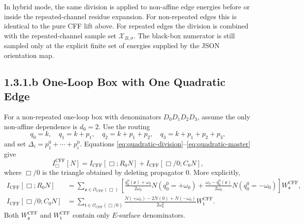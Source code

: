 \documentclass[11pt,a4paper]{report}
\newcommand{\CFF}{\operatorname{CFF}}
\newcommand{\Orient}{\mathcal O}
\newcommand{\Samples}{\mathcal X}
\begin{document}
In hybrid mode, the same division is applied to non-affine edge energies before
or inside the repeated-channel residue expansion.  For non-repeated edges this
is identical to the pure CFF lift above.  For repeated edges the division is
combined with the repeated-channel sample set
\(\Samples_{B,\sigma}\).  The black-box numerator is still sampled only at the
explicit finite set of energies supplied by the JSON orientation map.

\subsection*{1.3.1.b One-Loop Box with One Quadratic Edge}

For a non-repeated one-loop box with denominators \(D_0D_1D_2D_3\), assume the
only non-affine dependence is \(d_0=2\).  Use the routing
\[
  q_0=k,\quad q_1=k+p_1,\quad q_2=k+p_1+p_2,\quad
  q_3=k+p_1+p_2+p_3,
\]
and set \(\Delta_i=p_1^0+\cdots+p_i^0\).  Equations
\eqref{eq:quadratic-division}--\eqref{eq:quadratic-master} give
\begin{equation}
  I_{\Box}^{\CFF}[N]
  =
  I_{\CFF}[\Box;R_0N]
  +
  I_{\CFF}[\Box/0;C_0N],
  \label{eq:box-quadratic}
\end{equation}
where \(\Box/0\) is the triangle obtained by deleting propagator \(0\).  More
explicitly,
\begin{align}
  I_{\CFF}[\Box;R_0N]
  &=
  \sum_{\mathfrak o\in\Orient_{\CFF}(\Box)}
  \left[
  \frac{q_0^0(\mathfrak o)+\omega_0}{2\omega_0}N(q_0^0=+\omega_0)
  +
  \frac{\omega_0-q_0^0(\mathfrak o)}{2\omega_0}N(q_0^0=-\omega_0)
  \right]
  W_{\mathfrak o}^{\CFF},\\
  I_{\CFF}[\Box/0;C_0N]
  &=
  \sum_{\mathfrak t\in\Orient_{\CFF}(\Box/0)}
  \frac{
    N(+\omega_0)-2N(0)+N(-\omega_0)
  }{2\omega_0^2}
  W_{\mathfrak t}^{\CFF}.
\end{align}
Both \(W_{\mathfrak o}^{\CFF}\) and \(W_{\mathfrak t}^{\CFF}\) contain only
\(E\)-surface denominators.
\end{document}
